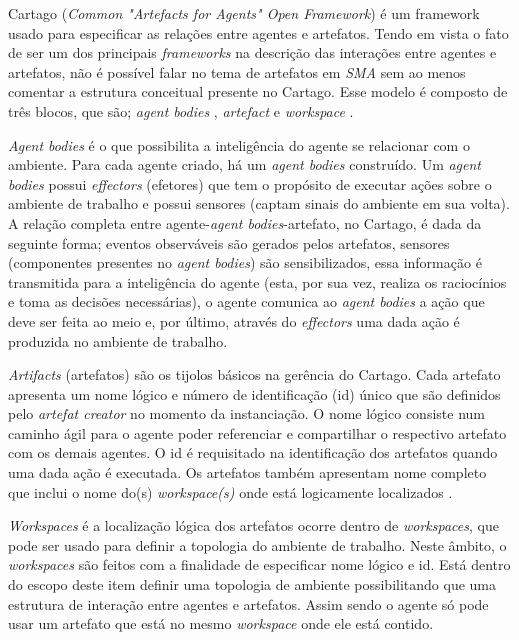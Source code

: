 Cartago (\textit{Common "Artefacts for Agents" Open Framework}) é um framework usado para especificar as relações entre agentes e artefatos. Tendo em vista o fato de ser um dos principais \textit{frameworks} na descrição das interações entre agentes e artefatos, não é possível falar no tema de artefatos em \textit{SMA} sem ao menos comentar a estrutura conceitual presente no Cartago. Esse modelo é composto de três blocos, que são; \textit{agent bodies} , \textit{artefact} e \textit{workspace} \cite{cartago}.

 \textit{Agent bodies} é  o que possibilita a inteligência do agente se relacionar com o ambiente. Para cada agente criado, há um \textit{agent bodies} construído. Um \textit{agent bodies} possui \textit{effectors} (efetores) que tem o propósito de executar ações sobre o ambiente de trabalho e possui sensores (captam sinais do ambiente em sua volta). A relação completa entre agente-\textit{agent bodies}-artefato, no Cartago, é dada da seguinte forma; eventos observáveis são gerados pelos artefatos, sensores (componentes presentes no \textit{agent bodies}) são sensibilizados, essa informação é transmitida para a inteligência do  agente (esta, por sua vez, realiza os raciocínios e toma as  decisões necessárias), o agente comunica ao \textit{agent bodies} a ação que deve ser feita ao 
 meio e, por último, através do \textit{effectors} uma dada ação é produzida no ambiente de trabalho. 

 \textit{Artifacts} (artefatos) são os tijolos básicos na gerência do Cartago. Cada artefato apresenta um nome lógico e número de identificação (id) único que são definidos pelo \textit{artefat creator} no momento da instanciação. O nome lógico consiste num caminho ágil para o agente poder referenciar  e compartilhar o respectivo artefato com os demais agentes. O id é requisitado na identificação dos artefatos quando uma dada ação é executada. Os artefatos também apresentam nome completo que inclui o nome do(s) \textit{workspace(s)} onde está logicamente localizados \cite{cartago}.

 \textit{Workspaces} é a localização lógica dos artefatos ocorre dentro de \textit{workspaces}, que pode ser usado para definir a topologia do ambiente de trabalho. Neste âmbito, o \textit{workspaces} são feitos com a finalidade de especificar nome lógico e id. Está dentro do escopo deste item definir uma topologia de ambiente possibilitando que uma estrutura de interação entre agentes e artefatos. Assim sendo o agente só pode usar um artefato que está no mesmo \textit{workspace} onde ele está contido. 